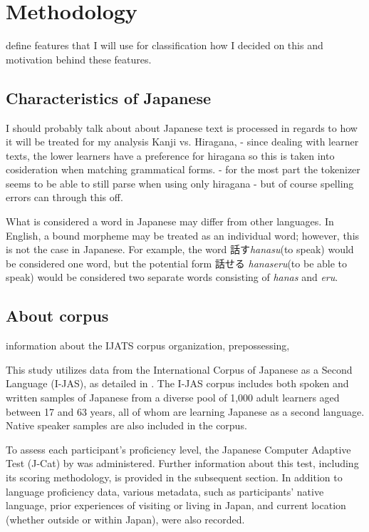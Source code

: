 \chapter{Methodology}
define  features that I will use for classification how I decided on this and motivation behind these features.

\section{Characteristics of Japanese}
I should probably talk about about Japanese text is processed in regards to how it will be treated for my analysis
   Kanji vs. Hiragana, - since dealing with learner texts, the lower learners have a preference for hiragana so this
is taken into cosideration when matching grammatical forms. - for the most part the tokenizer seems to be able to
still parse when using only hiragana - but of course spelling errors can through this off.

What is considered a word in Japanese may differ from other languages. In English, a bound morpheme may be treated as an individual word; however, this is not the case in Japanese. For example, the word 話す\textit{hanasu}(to speak) would be considered one word, but the potential form 話せる \textit{hanaseru}(to be able to speak) would be considered two separate words consisting of \textit{hanas} and \textit{eru}.

\section{About corpus}
information about the IJATS corpus organization, prepossessing,

This study utilizes data from the International Corpus of Japanese as a Second Language (I-JAS), as detailed in \citet{Sakoda2020}.  The I-JAS corpus includes both spoken and written samples of Japanese from a diverse pool of 1,000 adult learners aged between 17 and 63 years, all of whom are learning Japanese as a second language. Native speaker samples are also included in the corpus.

To assess each participant's proficiency level, the Japanese Computer Adaptive Test (J-Cat) by \citet{Imai2009} was administered. Further information about this test, including its scoring methodology, is provided in the subsequent section. In addition to language proficiency data, various metadata, such as participants' native language, prior experiences of visiting or living in Japan, and current location (whether outside or within Japan), were also recorded.

